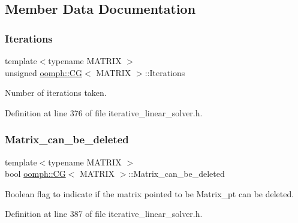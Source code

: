 \subsection{Member Data Documentation}
\mbox{\label{classoomph_1_1CG_a887d842b056091bcb8093f43a262d620}} 
\subsubsection{\texorpdfstring{Iterations}{Iterations}}
{\footnotesize\ttfamily template$<$typename M\+A\+T\+R\+IX $>$ \\
unsigned \hyperlink{classoomph_1_1CG}{oomph\+::\+CG}$<$ M\+A\+T\+R\+IX $>$\+::Iterations\hspace{0.3cm}{\ttfamily [private]}}



Number of iterations taken. 



Definition at line 376 of file iterative\+\_\+linear\+\_\+solver.\+h.

\mbox{\label{classoomph_1_1CG_aabb4b15b969d9e061411547b23bd4d9a}} 
\subsubsection{\texorpdfstring{Matrix\+\_\+can\+\_\+be\+\_\+deleted}{Matrix\_can\_be\_deleted}}
{\footnotesize\ttfamily template$<$typename M\+A\+T\+R\+IX $>$ \\
bool \hyperlink{classoomph_1_1CG}{oomph\+::\+CG}$<$ M\+A\+T\+R\+IX $>$\+::Matrix\+\_\+can\+\_\+be\+\_\+deleted\hspace{0.3cm}{\ttfamily [private]}}



Boolean flag to indicate if the matrix pointed to be Matrix\+\_\+pt can be deleted. 



Definition at line 387 of file iterative\+\_\+linear\+\_\+solver.\+h.

\mbox{\label{classoomph_1_1CG_a988bdcfb0c84bc14369092547afa4938}} 
